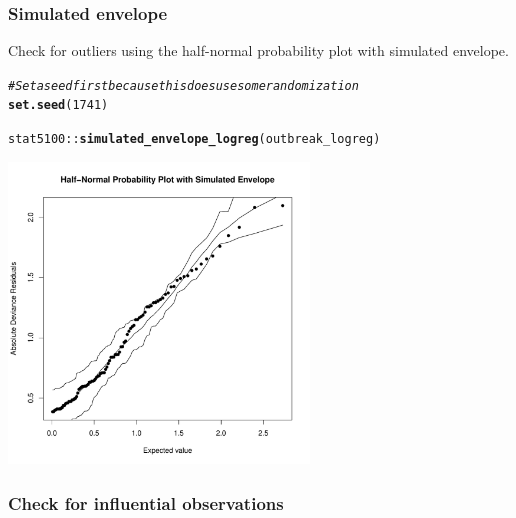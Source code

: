 \documentclass{article}\usepackage[]{graphicx}\usepackage[]{color}
\makeatletter
\newcommand{\hlnum}[1]{\textcolor[rgb]{0.686,0.059,0.569}{#1}}%
\newcommand{\hlcom}[1]{\textcolor[rgb]{0.678,0.584,0.686}{\textit{#1}}}%
\newcommand{\hlopt}[1]{\textcolor[rgb]{0,0,0}{#1}}%
\newcommand{\hlstd}[1]{\textcolor[rgb]{0.345,0.345,0.345}{#1}}%
\newcommand{\hlkwd}[1]{\textcolor[rgb]{0.737,0.353,0.396}{\textbf{#1}}}%
\newenvironment{kframe}{%
 \def\at@end@of@kframe{}%
 \ifinner\ifhmode%
  \def\at@end@of@kframe{\end{minipage}}%
  \begin{minipage}{\columnwidth}%
 \fi\fi%
 \def\FrameCommand##1{\hskip\@totalleftmargin \hskip-\fboxsep
 \colorbox{shadecolor}{##1}\hskip-\fboxsep
     \hskip-\linewidth \hskip-\@totalleftmargin \hskip\columnwidth}%
 \MakeFramed {\advance\hsize-\width
   \@totalleftmargin\z@ \linewidth\hsize
   \@setminipage}}%
 {\par\unskip\endMakeFramed%
 \at@end@of@kframe}
\newenvironment{knitrout}{}{} %
\makeatother
\begin{document}
\subsubsection*{Simulated envelope}

Check for outliers using the half-normal probability plot with simulated envelope.

\begin{knitrout}
\color{fgcolor}\begin{kframe}
\begin{alltt}
\hlcom{# Set a seed first because this does use some randomization}
\hlkwd{set.seed}\hlstd{(}\hlnum{1741}\hlstd{)}

\hlstd{stat5100}\hlopt{::}\hlkwd{simulated_envelope_logreg}\hlstd{(outbreak_logreg)}
\end{alltt}
\end{kframe}

{\centering \includegraphics[width=0.6\textwidth]{figure/unnamed-chunk-8-1} 

}



\end{knitrout}

\subsubsection*{Check for influential observations}\
\end{document}
